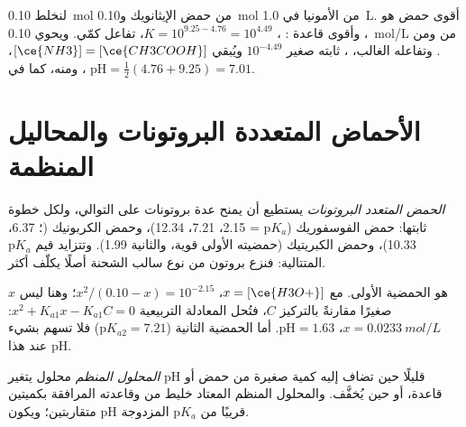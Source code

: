\begin{example}\label{ex:b1:predominant-reaction:mixture}
لنخلط \qty{0.10}{mol} من حمض الإيثانويك و\qty{0.10}{mol} من الأمونيا في
\qty{1.0}{L}. أقوى حمض هو ، وأقوى قاعدة
: ، $K = 10^{9.25 - 4.76} =
10^{4.49}$، تفاعل كمّي. ويحوي 
\qty{0.10}{mol/L} من  ومن . وتفاعله
الغالب، ، ثابته صغير
$10^{-4.49}$ ويُبقي $[\ce{NH3}] = [\ce{CH3COOH}]$، ومنه، كما في
، $\mathrm{pH} = \frac12(4.76 + 9.25) = 7.01$.
\end{example}

\section{الأحماض المتعددة البروتونات والمحاليل المنظمة}

\begin{definition}\label{def:b1:predominant-reaction:polyprotic}
\emph{الحمض المتعدد البروتونات} يستطيع أن يمنح عدة بروتونات
على التوالي، ولكل خطوة ثابتها: حمض الفوسفوريك
 ($\mathrm{p}K_a$ = 2.15، 7.21، 12.34)، وحمض الكربونيك
(؛ 6.37، 10.33)، وحمض الكبريتيك (حمضيته الأولى قوية، والثانية
1.99). وتتزايد قيم $\mathrm{p}K_a$ المتتالية: فنزع بروتون من
نوع سالب الشحنة أصلًا يكلّف أكثر.
\end{definition}

\begin{example}\label{ex:b1:predominant-reaction:h3po4}
 هو الحمضية الأولى. مع $x = [\ce{H3O+}]$،
$x^2/(0.10 - x) = 10^{-2.15}$؛ وهنا ليس $x$ صغيرًا مقارنةً بالتركيز $C$،
فتُحل المعادلة التربيعية $x^2 + K_{a1}x - K_{a1}C = 0$: $x =
\qty{0.0233}{mol/L}$، $\mathrm{pH} = 1.63$. أما الحمضية الثانية
($\mathrm{p}K_{a2} = 7.21$) فلا تسهم بشيء عند هذا pH.
\end{example}

\begin{definition}\label{def:b1:predominant-reaction:buffer}
\emph{المحلول المنظم} محلول يتغير pH
قليلًا حين تضاف إليه كمية صغيرة من حمض أو قاعدة، أو حين
يُخفَّف. والمحلول المنظم المعتاد خليط من  وقاعدته المرافقة
بكميتين متقاربتين؛ ويكون pH قريبًا من $\mathrm{p}K_a$
المزدوجة.
\end{definition}

